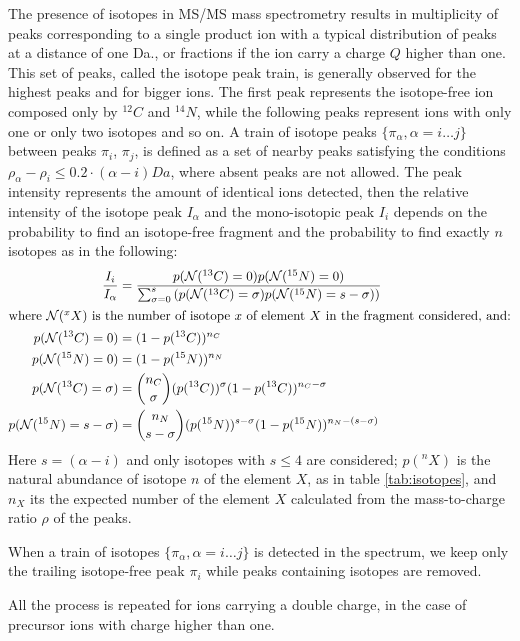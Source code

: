 The presence of isotopes in MS/MS mass spectrometry results in multiplicity of
peaks corresponding to a single product ion with a typical distribution of peaks
at a distance of one Da., or fractions if the ion carry a charge $Q$ higher than
one.
This set of peaks, called the isotope peak train, is generally observed for the
highest peaks and for bigger ions. 
The first peak represents the
isotope-free ion composed only by $^{12}C$ and $^{14}N$, while
the following peaks represent ions with only one or only two isotopes and
so on.
A train of isotope peaks $\{\pi_\alpha,\alpha=i\dots j\}$ 
between peaks 
$\pi_i$, $\pi_j$, is defined as a set of nearby peaks satisfying the conditions 
$\rho_\alpha-\rho_i\le0.2\cdot(\alpha-i) Da$, where absent peaks are not allowed.
The peak intensity represents the amount of identical ions detected, then
the relative intensity of the isotope peak $I_\alpha$ and
the mono-isotopic peak $I_i$ depends on the probability to find an
isotope-free fragment and the probability to find exactly $n$ isotopes as in the
following:
\begin{align}
 \frac{I_i}{I_\alpha} &= 
\frac{p(\mathcal N(^{13}C)=0)p(\mathcal N(^{15}N)=0)}
{\sum_{\sigma=0}^s \left(
p(\mathcal N(^{13}C)=\sigma)p(\mathcal N(^{15}N)=s-\sigma)
\right)}
\label{eq:isotope-int}\\
\intertext{where $\mathcal N(^x X)$ is the number of isotope $x$ of element
$X$ in the fragment considered, and:}
p(\mathcal N(^{13}C)=0)&=(1-p({^{13}C}))^{n_C}\\
p(\mathcal N(^{15}N)=0)&=(1-p({^{15}N}))^{n_N}\\
p(\mathcal N(^{13}C)=\sigma) &= \binom{n_C} \sigma
(p({^{13}C}))^\sigma (1-p({^{13}C}))^{n_C-\sigma}\\
p(\mathcal N(^{15}N)=s-\sigma)&= \binom{n_N}{s-\sigma}
(p({^{15}N}))^{s-\sigma}(1-p({^{15}N}))^{n_N-(s-\sigma)}
\end{align}
Here $s=(\alpha-i)$ and only isotopes with $s\le4$ are considered; %
$p({^n X})$ 
is the natural abundance of isotope $n$ of the element $X$, as in table
\ref{tab:isotopes}, and $n_X$ its the expected number of the element $X$
calculated from the mass-to-charge ratio $\rho$ of the peaks.

When a train of isotopes $\{\pi_\alpha,\alpha=i\dots j\}$ is detected in the
spectrum, we keep only the trailing isotope-free peak $\pi_i$ while peaks
containing isotopes are removed.

All the process is repeated for ions carrying a double charge, in the case
of precursor ions with charge higher than one.



